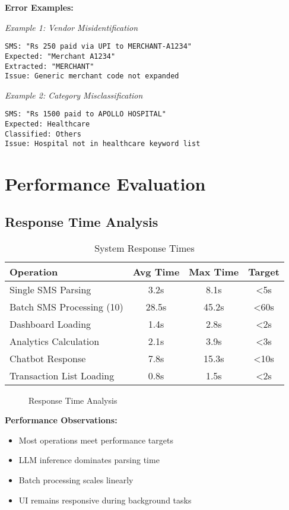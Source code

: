 \documentclass[11pt,a4paper]{report}
\begin{document}
\textbf{Error Examples:}

\textit{Example 1: Vendor Misidentification}
\begin{lstlisting}
SMS: "Rs 250 paid via UPI to MERCHANT-A1234"
Expected: "Merchant A1234"
Extracted: "MERCHANT"
Issue: Generic merchant code not expanded
\end{lstlisting}

\textit{Example 2: Category Misclassification}
\begin{lstlisting}
SMS: "Rs 1500 paid to APOLLO HOSPITAL"
Expected: Healthcare
Classified: Others
Issue: Hospital not in healthcare keyword list
\end{lstlisting}

\section{Performance Evaluation}

\subsection{Response Time Analysis}

\begin{table}[H]
\centering
\caption{System Response Times}
\begin{tabular}{|l|c|c|c|}
\hline
\textbf{Operation} & \textbf{Avg Time} & \textbf{Max Time} & \textbf{Target} \\
\hline
Single SMS Parsing & 3.2s & 8.1s & <5s \\
Batch SMS Processing (10) & 28.5s & 45.2s & <60s \\
Dashboard Loading & 1.4s & 2.8s & <2s \\
Analytics Calculation & 2.1s & 3.9s & <3s \\
Chatbot Response & 7.8s & 15.3s & <10s \\
Transaction List Loading & 0.8s & 1.5s & <2s \\
\hline
\end{tabular}
\end{table}

\begin{figure}[htbp]
    \centering
    \caption{Response Time Analysis}
    \label{fig:response_time}
\end{figure}

\textbf{Performance Observations:}
\begin{itemize}
    \item Most operations meet performance targets
    \item LLM inference dominates parsing time
    \item Batch processing scales linearly
    \item UI remains responsive during background tasks
\end{itemize}
\end{document}
